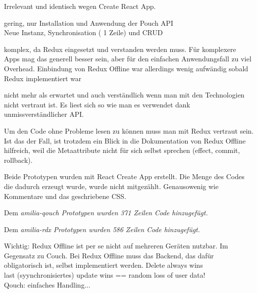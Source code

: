 
Irrelevant und identisch wegen Create React App.

%
\begin{description}[leftmargin=0.5cm,style=nextline]
  \item[amilia-qouch]
  gering, nur Installation und Anwendung der Pouch API\\
  Neue Instanz, Synchronisation ( 1 Zeile) und CRUD
  \item[amilia-rdx]
  komplex, da Redux eingesetzt und verstanden werden muss. Für komplexere Apps mag das generell besser sein, aber für den einfachen Anwendungsfall zu viel Overhead. Einbindung von Redux Offline war allerdings wenig aufwändig sobald Redux implementiert war
\end{description}
%
\begin{description}[leftmargin=0.5cm,style=nextline]
  \item[amilia-qouch]
  nicht mehr als erwartet und auch verständlich wenn man mit den Technologien nicht vertraut ist. Es liest sich so wie man es verwendet dank unmissverständlicher API.
  \item[amilia-rdx] 
  Um den Code ohne Probleme lesen zu können muss man mit Redux vertraut sein. Ist das der Fall, ist trotzdem ein Blick in die Dokumentation von Redux Offline hilfreich, weil die Metaattribute nicht für sich selbst sprechen (effect, commit, rollback).
\end{description}
%
  Beide Prototypen wurden mit React Create App erstellt. Die Menge des Codes die dadurch erzeugt wurde, wurde nicht mitgezählt. Genausowenig wie Kommentare und das geschriebene \gls{CSS}.
  \begin{description}[leftmargin=0.5cm,style=nextline]
    \item[amilia-qouch]
    Dem \it{amilia-qouch} Prototypen wurden 371 Zeilen Code hinzugefügt.
    \item[amilia-rdx] 
    Dem \it{amilia-rdx} Prototypen wurden 586 Zeilen Code hinzugefügt.
\end{description}
Wichtig: Redux Offline ist per se nicht auf mehreren Geräten nutzbar. Im Gegensatz zu Couch. Bei Redux Offline muss das Backend, das dafür obligatorisch ist, selbst implementiert werden.
%
Delete always wins\\
last (syynchronisiertes) update wins == random loss of user data!\\
Qouch: einfaches Handling...

